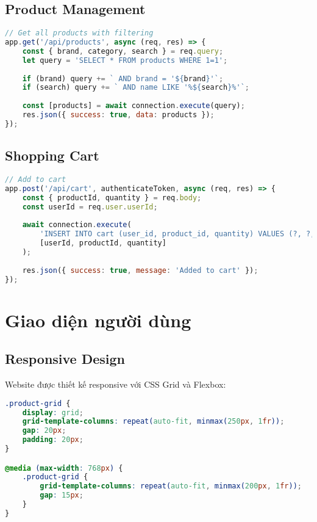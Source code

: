 \subsection{Product Management}
\begin{lstlisting}[language=JavaScript, title={Product API}]
// Get all products with filtering
app.get('/api/products', async (req, res) => {
    const { brand, category, search } = req.query;
    let query = 'SELECT * FROM products WHERE 1=1';
    
    if (brand) query += ` AND brand = '${brand}'`;
    if (search) query += ` AND name LIKE '%${search}%'`;
    
    const [products] = await connection.execute(query);
    res.json({ success: true, data: products });
});
\end{lstlisting}

\subsection{Shopping Cart}
\begin{lstlisting}[language=JavaScript, title={Cart Management}]
// Add to cart
app.post('/api/cart', authenticateToken, async (req, res) => {
    const { productId, quantity } = req.body;
    const userId = req.user.userId;
    
    await connection.execute(
        'INSERT INTO cart (user_id, product_id, quantity) VALUES (?, ?, ?)',
        [userId, productId, quantity]
    );
    
    res.json({ success: true, message: 'Added to cart' });
});
\end{lstlisting}

\section{Giao diện người dùng}

\subsection{Responsive Design}
Website được thiết kế responsive với CSS Grid và Flexbox:
\begin{lstlisting}[language=CSS, title={Responsive CSS}]
.product-grid {
    display: grid;
    grid-template-columns: repeat(auto-fit, minmax(250px, 1fr));
    gap: 20px;
    padding: 20px;
}

@media (max-width: 768px) {
    .product-grid {
        grid-template-columns: repeat(auto-fit, minmax(200px, 1fr));
        gap: 15px;
    }
}
\end{lstlisting}


